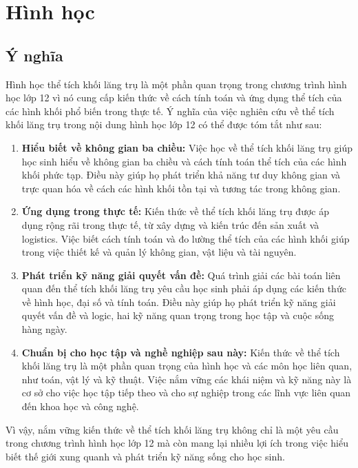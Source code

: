 \chapter{Hình học}
\section{Ý nghĩa}

Hình học thể tích khối lăng trụ là một phần quan trọng trong chương trình hình học lớp 12 vì nó cung cấp kiến thức về cách tính toán và ứng dụng thể tích của các hình khối phổ biến trong thực tế. Ý nghĩa của việc nghiên cứu về thể tích khối lăng trụ trong nội dung hình học lớp 12 có thể được tóm tắt như sau:

\begin{enumerate}[label={-}]
    \item \textbf{Hiểu biết về không gian ba chiều:} Việc học về thể tích khối lăng trụ giúp học sinh hiểu về không gian ba chiều và cách tính toán thể tích của các hình khối phức tạp. Điều này giúp họ phát triển khả năng tư duy không gian và trực quan hóa về cách các hình khối tồn tại và tương tác trong không gian.
    
    \item \textbf{Ứng dụng trong thực tế:} Kiến thức về thể tích khối lăng trụ được áp dụng rộng rãi trong thực tế, từ xây dựng và kiến trúc đến sản xuất và logistics. Việc biết cách tính toán và đo lường thể tích của các hình khối giúp trong việc thiết kế và quản lý không gian, vật liệu và tài nguyên.
    
    \item \textbf{Phát triển kỹ năng giải quyết vấn đề:} Quá trình giải các bài toán liên quan đến thể tích khối lăng trụ yêu cầu học sinh phải áp dụng các kiến thức về hình học, đại số và tính toán. Điều này giúp họ phát triển kỹ năng giải quyết vấn đề và logic, hai kỹ năng quan trọng trong học tập và cuộc sống hàng ngày.
    
    \item \textbf{Chuẩn bị cho học tập và nghề nghiệp sau này:} Kiến thức về thể tích khối lăng trụ là một phần quan trọng của hình học và các môn học liên quan, như toán, vật lý và kỹ thuật. Việc nắm vững các khái niệm và kỹ năng này là cơ sở cho việc học tập tiếp theo và cho sự nghiệp trong các lĩnh vực liên quan đến khoa học và công nghệ.
\end{enumerate}

Vì vậy, nắm vững kiến thức về thể tích khối lăng trụ không chỉ là một yêu cầu trong chương trình hình học lớp 12 mà còn mang lại nhiều lợi ích trong việc hiểu biết thế giới xung quanh và phát triển kỹ năng sống cho học sinh.

